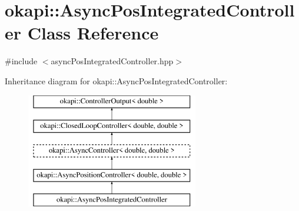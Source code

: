 \hypertarget{classokapi_1_1AsyncPosIntegratedController}{}\section{okapi\+::Async\+Pos\+Integrated\+Controller Class Reference}
\label{classokapi_1_1AsyncPosIntegratedController}


{\ttfamily \#include $<$async\+Pos\+Integrated\+Controller.\+hpp$>$}

Inheritance diagram for okapi\+::Async\+Pos\+Integrated\+Controller\+:\begin{figure}[H]
\begin{center}
\leavevmode
\includegraphics[height=5.000000cm]{classokapi_1_1AsyncPosIntegratedController}
\end{center}
\end{figure}

